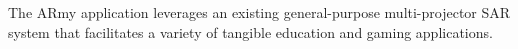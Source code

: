 \documentclass[10pt,twocolumn,letterpaper]{article}
\begin{document}




The ARmy application leverages an existing general-purpose
multi-projector SAR system \cite{Sheng2009} that facilitates a variety of tangible
education and gaming applications. 
\end{document}
